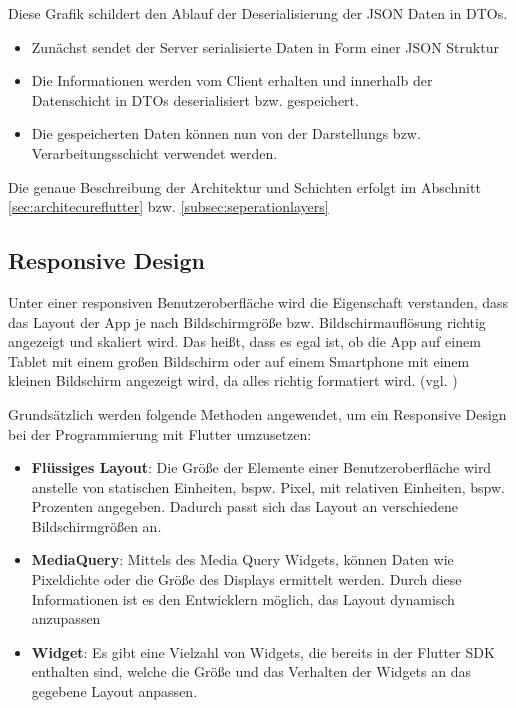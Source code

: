 Diese Grafik schildert den Ablauf der Deserialisierung der JSON Daten in DTOs.
\begin{itemize}
    \item Zunächst sendet der Server serialisierte Daten in Form einer JSON Struktur
    \item Die Informationen werden vom Client erhalten und innerhalb der Datenschicht in DTOs deserialisiert bzw. gespeichert.
    \item Die gespeicherten Daten können nun von der Darstellungs bzw. Verarbeitungsschicht verwendet werden. 
\end{itemize}

Die genaue Beschreibung der Architektur und Schichten erfolgt im Abschnitt \ref{sec:architecureflutter}  bzw. \ref{subsec:seperationlayers} 

\newpage

\subsection{Responsive Design}\label{subsec:thero:responsive}
Unter einer responsiven Benutzeroberfläche wird die Eigenschaft verstanden, dass das Layout der App je nach Bildschirmgröße bzw. Bildschirmauflösung richtig angezeigt und skaliert wird. Das heißt, dass es egal ist, ob die App auf einem Tablet mit einem großen Bildschirm oder auf einem Smartphone mit einem kleinen Bildschirm angezeigt wird, da alles richtig formatiert wird. (vgl. \cite{responsive-design})

Grundsätzlich werden folgende Methoden angewendet, um ein Responsive Design bei der Programmierung mit Flutter umzusetzen:
\begin{itemize}
    \item {\textbf{Flüssiges Layout}}: Die Größe der Elemente einer Benutzeroberfläche wird anstelle von statischen Einheiten, bspw. Pixel, mit relativen Einheiten, bspw. Prozenten angegeben. Dadurch passt sich das Layout an verschiedene Bildschirmgrößen an.
    
    \item {\textbf{MediaQuery}}: Mittels des Media Query Widgets, können Daten wie Pixeldichte oder die Größe des Displays ermittelt werden. Durch diese Informationen ist es den Entwicklern möglich, das Layout dynamisch anzupassen
    
    \item {\textbf{Widget}}: Es gibt eine Vielzahl von Widgets, die bereits in der Flutter SDK enthalten sind, welche die Größe und das Verhalten der Widgets an das gegebene Layout anpassen.
\end{itemize}

